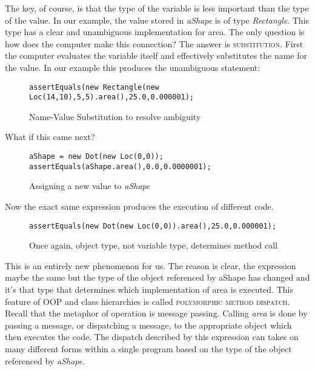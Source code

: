 \documentclass[]{tufte-handout}
\begin{document}
The key, of course, is that the type of the variable is less important than the type of the value. In our example, the value stored in \textit{aShape} is of type \textit{Rectangle}. This type has a clear and unambiguous implementation for area. The only question is how does the computer make this connection? The answer is \textsc{substitution}. 
First the computer evaluates the variable itself and effectively substitutes the name for the value. In our example this produces the unambiguous statement:
\begin{figure}
\begin{lstlisting}
assertEquals(new Rectangle(new Loc(14,10),5,5).area(),25.0,0.000001);
\end{lstlisting}
\caption{Name-Value Substitution to resolve ambiguity}
\end{figure}

What if this came next? 
\begin{figure}
\begin{lstlisting}
aShape = new Dot(new Loc(0,0));
assertEquals(aShape.area(),0.0,0.0000001);
\end{lstlisting}
\caption{Assigning a new value to \textit{aShape}}
\end{figure}

Now the exact same expression produces the execution of different code. 
\begin{figure}
\begin{lstlisting}
assertEquals(new Dot(new Loc(0,0)).area(),25.0,0.000001);
\end{lstlisting}
\caption{Once again, object type, not variable type, determines method call}
\end{figure}

This is an entirely new phenomenon for us. The reason is clear, the expression maybe the same but the type of the object referenced by aShape has changed and it's that type that determines which implementation of area is executed. This feature of OOP and class hierarchies is called \textsc{polymorphic method dispatch}. Recall that the metaphor of operation is message passing. Calling \textit{area} is done by passing a message, or dispatching a message, to the appropriate object which then executes the code. The dispatch described by this expression can takes on many different forms within a single program based on the type of the object referenced by \textit{aShape}.
\end{document}
